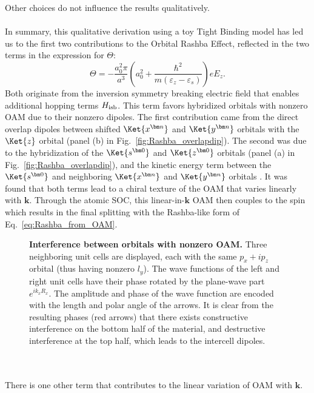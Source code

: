 Other choices do not influence the results qualitatively.
\\\\
In summary, this qualitative derivation using a toy Tight Binding model has led us to the first two contributions to the Orbital Rashba Effect, reflected in the two terms in the expression for $\Theta$:
\begin{equation}
\Theta = -\frac{a_0^2 \pi}{a^3}\left(a_0^2 + \frac{\hbar^2}{m(\varepsilon_z - \varepsilon_s)}\right) e E_z.
\end{equation}
Both originate from the inversion symmetry breaking electric field that enables additional hopping terms $H_{\rm isb}$.
This term favors hybridized orbitals with nonzero OAM due to their nonzero dipoles. 
The first contribution came from the direct overlap dipoles between shifted $\Ket{x^{\bm n}}$ and $\Ket{y^{\bm n}}$ orbitals with the $\Ket{z}$ orbital (panel (b) in Fig.~\ref{fig:Rashba_overlapdip})\cite{Petersen2000}.
The second was due to the hybridization of the $\Ket{s^{\bm 0}}$ and $\Ket{z^{\bm 0}}$ orbitals (panel (a) in Fig.~\ref{fig:Rashba_overlapdip}), and the kinetic energy term between the $\Ket{s^{\bm 0}}$ and neighboring $\Ket{x^{\bm n}}$ and $\Ket{y^{\bm n}}$ orbitals \cite{Go2016}.
It was found that both terms lead to a chiral texture of the OAM that varies linearly with $\bm k$.
Through the atomic SOC, this linear-in-$\bm k$ OAM then couples to the spin which results in the final splitting with the Rashba-like form of Eq.~\eqref{eq:Rashba_from_OAM}.
\begin{figure}
\caption{\label{fig:Rashba_interference}{\bf Interference between orbitals with nonzero OAM.} Three neighboring unit cells are displayed, each with the same $p_x + ip_z$ orbital (thus having nonzero $l_y$). The wave functions of the left and right unit cells have their phase rotated by the plane-wave part $e^{i k_x R_x}$. The amplitude and phase of the wave function are encoded with the length and polar angle of the arrows. It is clear from the resulting phases (red arrows) that there exists constructive interference on the bottom half of the material, and destructive interference at the top half, which leads to the intercell dipoles.}
\end{figure}
\\\\
There is one other term that contributes to the linear variation of OAM with $\bm{k}$.

